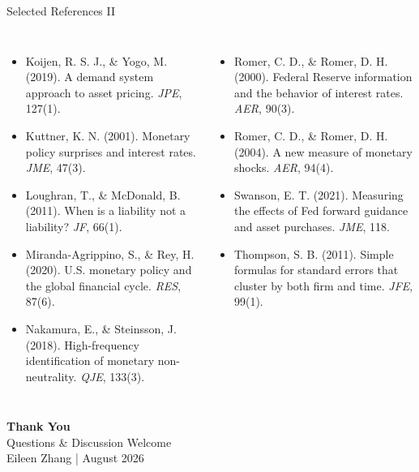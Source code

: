\documentclass[aspectratio=169, 11pt]{beamer}
\begin{document}
\begin{frame}{Selected References II}
  \footnotesize
  \begin{columns}[T]
    \begin{itemize}
      \item Koijen, R. S. J., \& Yogo, M. (2019). A demand system approach to asset pricing. \textit{JPE}, 127(1).
      \item Kuttner, K. N. (2001). Monetary policy surprises and interest rates. \textit{JME}, 47(3).
      \item Loughran, T., \& McDonald, B. (2011). When is a liability not a liability? \textit{JF}, 66(1).
      \item Miranda-Agrippino, S., \& Rey, H. (2020). U.S. monetary policy and the global financial cycle. \textit{RES}, 87(6).
      \item Nakamura, E., \& Steinsson, J. (2018). High-frequency identification of monetary non-neutrality. \textit{QJE}, 133(3).
    \end{itemize}

    \begin{itemize}
      \item Romer, C. D., \& Romer, D. H. (2000). Federal Reserve information and the behavior of interest rates. \textit{AER}, 90(3).
      \item Romer, C. D., \& Romer, D. H. (2004). A new measure of monetary shocks. \textit{AER}, 94(4).
      \item Swanson, E. T. (2021). Measuring the effects of Fed forward guidance and asset purchases. \textit{JME}, 118.
      \item Thompson, S. B. (2011). Simple formulas for standard errors that cluster by both firm and time. \textit{JFE}, 99(1).
    \end{itemize}
  \end{columns}
\end{frame}

\begin{frame}[plain]
  \vfill
  \centering
  {\Large\bfseries\color{myblue} Thank You}\\[0.5em]
  {\normalsize Questions \& Discussion Welcome}\\[1.5em]
  {\footnotesize\color{myblue!70} Eileen Zhang \quad | \quad August 2026}
  \vfill
\end{frame}
\end{document}

